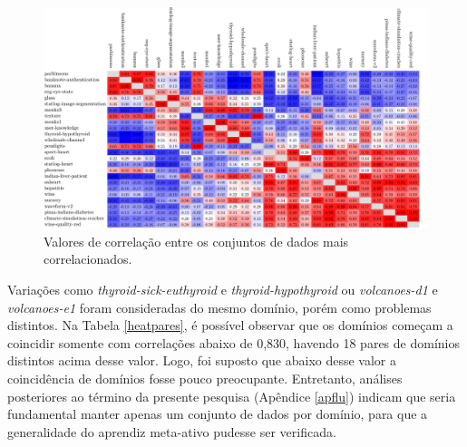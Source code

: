 \begin{landscape}
\begin{figure}
  \setlength{\unitlength}{1.0cm}
  \centering
    \includegraphics[scale=0.43]{images/heatmap-final-datasets.pdf}
  \caption[Valores de correlação entre conjuntos de dados mais correlacionados.]{
Valores de correlação entre os conjuntos de dados mais correlacionados.
}
  \label{datasetsimis}
\end{figure}
\end{landscape}
Variações como \textit{thyroid-sick-euthyroid} e \textit{thyroid-hypothyroid} ou \textit{volcanoes-d1} e \textit{volcanoes-e1} foram consideradas do mesmo domínio, porém como problemas distintos.
Na Tabela \ref{heatpares}, é possível observar que os domínios começam a coincidir somente com correlações abaixo de 0,830, havendo 18 pares de domínios distintos acima desse valor.
Logo, foi suposto que abaixo desse valor a coincidência de domínios fosse pouco preocupante.
Entretanto, análises posteriores ao término da presente pesquisa (Apêndice \ref{apflu}) indicam que seria fundamental manter apenas um conjunto de dados por domínio, para que a generalidade do aprendiz meta-ativo pudesse ser verificada.
